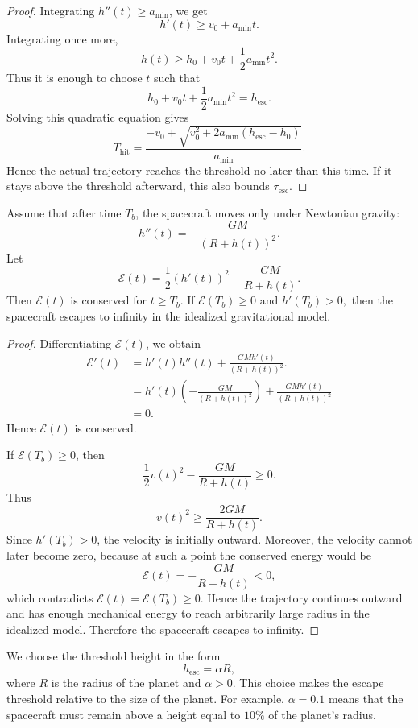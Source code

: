 \begin{proof}
Integrating $h''(t)\geq a_{\min}$, we get
\[
    h'(t)\geq v_0+a_{\min}t.
\]
Integrating once more,
\[
    h(t)\geq h_0+v_0t+\frac12a_{\min}t^2.
\]
Thus it is enough to choose $t$ such that
\[
    h_0+v_0t+\frac12a_{\min}t^2 = h_{\mathrm{esc}}.
\]
Solving this quadratic equation gives
\[
    T_{\mathrm{hit}} = \frac{ -v_0+\sqrt{v_0^2+2a_{\min}(h_{\mathrm{esc}}-h_0)} }{a_{\min}}.
\]
Hence the actual trajectory reaches the threshold no later than this time. 
If it stays above the threshold afterward, this also bounds $\tau_{\mathrm{esc}}$.
\end{proof}
\begin{lemma}
Assume that after time $T_b$, the spacecraft moves only under Newtonian gravity:
\[
    h''(t)=-\frac{GM}{(R+h(t))^2}.
\]
Let
\[
    \mathcal E(t) = \frac12(h'(t))^2-\frac{GM}{R+h(t)}.
\]
Then $\mathcal E(t)$ is conserved for $t\geq T_b$. 
If
$\mathcal E(T_b)\geq 0$ and $h'(T_b)>0,$
then the spacecraft escapes to infinity in the idealized gravitational model.
\end{lemma}

\begin{proof}
Differentiating $\mathcal E(t)$, we obtain
\begin{align*}
    \mathcal E'(t) &= h'(t)h''(t) + \frac{GMh'(t)}{(R+h(t))^2}.\\
    &= h'(t)\left(-\frac{GM}{(R+h(t))^2}\right) + \frac{GMh'(t)}{(R+h(t))^2} \\
    &=0.
\end{align*}
Hence $\mathcal E(t)$ is conserved.

If $\mathcal E(T_b)\geq 0$, then
\[
    \frac12v(t)^2-\frac{GM}{R+h(t)}\geq 0.
\]
Thus
\[
    v(t)^2\geq \frac{2GM}{R+h(t)}.
\]
Since $h'(T_b)>0$, the velocity is initially outward. Moreover, the velocity cannot later become zero, because at such a point the conserved energy would be
\[
    \mathcal E(t)=-\frac{GM}{R+h(t)}<0,
\]
which contradicts $\mathcal E(t)=\mathcal E(T_b)\geq0$. Hence the trajectory continues outward and has enough mechanical energy to reach arbitrarily large radius in the idealized model. Therefore the spacecraft escapes to infinity.
\end{proof}
We choose the threshold height in the form
\[
    \boxed{ h_{\mathrm{esc}}=\alpha R,}
\]
where $R$ is the radius of the planet and $\alpha>0$. 
This choice makes the escape threshold relative to the size of the planet. 
For example, $\alpha=0.1$ means that the spacecraft must remain above a height equal to $10\%$ of the planet's radius.

